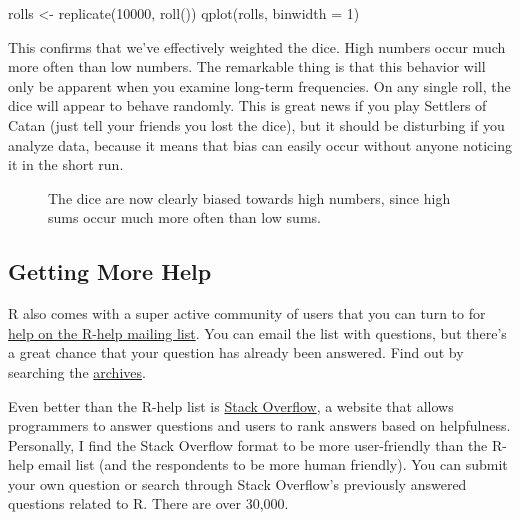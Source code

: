 \documentclass[
  letterpaper,
  DIV=11,
  numbers=noendperiod]{scrbook}
\makeatletter
\newenvironment{Shaded}{\begin{snugshade}}{\end{snugshade}}
\newcommand{\AttributeTok}[1]{\textcolor[rgb]{0.40,0.45,0.13}{#1}}
\newcommand{\DecValTok}[1]{\textcolor[rgb]{0.68,0.00,0.00}{#1}}
\newcommand{\FunctionTok}[1]{\textcolor[rgb]{0.28,0.35,0.67}{#1}}
\newcommand{\NormalTok}[1]{\textcolor[rgb]{0.00,0.23,0.31}{#1}}
\newcommand{\OtherTok}[1]{\textcolor[rgb]{0.00,0.23,0.31}{#1}}
\newcommand*\pandocbounded[1]{%
  \sbox\pandoc@box{#1}%
  \Gscale@div\@tempa{\textheight}{\dimexpr\ht\pandoc@box+\dp\pandoc@box\relax}%
  \Gscale@div\@tempb{\linewidth}{\wd\pandoc@box}%
  \ifdim\@tempb\p@<\@tempa\p@\let\@tempa\@tempb\fi%
  \ifdim\@tempa\p@<\p@\scalebox{\@tempa}{\usebox\pandoc@box}%
  \else\usebox{\pandoc@box}%
  \fi%
}
\makeatother
\begin{document}
\begin{Shaded}
\begin{Highlighting}[]
\NormalTok{rolls }\OtherTok{\textless{}{-}} \FunctionTok{replicate}\NormalTok{(}\DecValTok{10000}\NormalTok{, }\FunctionTok{roll}\NormalTok{())}
\FunctionTok{qplot}\NormalTok{(rolls, }\AttributeTok{binwidth =} \DecValTok{1}\NormalTok{)}
\end{Highlighting}
\end{Shaded}

This confirms that we've effectively weighted the dice. High numbers
occur much more often than low numbers. The remarkable thing is that
this behavior will only be apparent when you examine long-term
frequencies. On any single roll, the dice will appear to behave
randomly. This is great news if you play Settlers of Catan (just tell
your friends you lost the dice), but it should be disturbing if you
analyze data, because it means that bias can easily occur without anyone
noticing it in the short run.

\begin{figure}

\centering{

\pandocbounded{\texttt{[image: images/hopr\_0205.png]}}

}

\caption{\label{fig-weighted}The dice are now clearly biased towards
high numbers, since high sums occur much more often than low sums.}

\end{figure}%

\subsection{Getting More Help}\label{getting-more-help}

R also comes with a super active community of users that you can turn to
for \href{http://bit.ly/r-help}{help on the R-help mailing list}. You
can email the list with questions, but there's a great chance that your
question has already been answered. Find out by searching the
\href{http://bit.ly/R_archives}{archives}.

Even better than the R-help list is
\href{http://stackoverflow.com}{Stack Overflow}, a website that allows
programmers to answer questions and users to rank answers based on
helpfulness. Personally, I find the Stack Overflow format to be more
user-friendly than the R-help email list (and the respondents to be more
human friendly). You can submit your own question or search through
Stack Overflow's previously answered questions related to R. There are
over 30,000.
\end{document}
